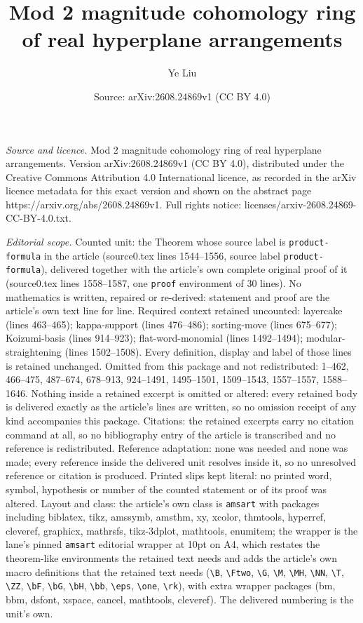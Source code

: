 \documentclass[10pt,a4paper]{amsart}
\title[Mod 2 magnitude cohomology ring of real hyperplane arrangeme]{Mod 2 magnitude cohomology ring of real hyperplane arrangements}
\author{Ye Liu}
\date{Source: arXiv:2608.24869v1 (CC BY 4.0)}
\begin{document}
\maketitle

\noindent\emph{Source and licence.} Mod 2 magnitude cohomology ring of real hyperplane arrangements. Version arXiv:2608.24869v1 (CC BY 4.0), distributed under the Creative Commons Attribution 4.0 International licence, as recorded in the arXiv licence metadata for this exact version and shown on the abstract page https://arxiv.org/abs/2608.24869v1. Full rights notice: licenses/arxiv-2608.24869-CC-BY-4.0.txt.\par\smallskip

\noindent\textit{Editorial scope.} Counted unit: the Theorem whose source label is \texttt{product-formula} in the article (source0.tex lines 1544--1556, source label \texttt{product-formula}), delivered together with the article's own complete original proof of it (source0.tex lines 1558--1587, one \texttt{proof} environment of 30 lines). No mathematics is written, repaired or re-derived: statement and proof are the article's own text line for line. Required context retained uncounted: layercake (lines 463--465); kappa-support (lines 476--486); sorting-move (lines 675--677); Koizumi-basis (lines 914--923); flat-word-monomial (lines 1492--1494); modular-straightening (lines 1502--1508). Every definition, display and label of those lines is retained unchanged. Omitted from this package and not redistributed: 1--462, 466--475, 487--674, 678--913, 924--1491, 1495--1501, 1509--1543, 1557--1557, 1588--1646. Nothing inside a retained excerpt is omitted or altered: every retained body is delivered exactly as the article's lines are written, so no omission receipt of any kind accompanies this package. Citations: the retained excerpts carry no citation command at all, so no bibliography entry of the article is transcribed and no reference is redistributed. Reference adaptation: none was needed and none was made; every reference inside the delivered unit resolves inside it, so no unresolved reference or citation is produced. Printed slips kept literal: no printed word, symbol, hypothesis or number of the counted statement or of its proof was altered. Layout and class: the article's own class is \texttt{amsart} with packages including biblatex, tikz, amssymb, amsthm, xy, xcolor, thmtools, hyperref, cleveref, graphicx, mathrsfs, tikz-3dplot, mathtools, enumitem; the wrapper is the lane's pinned \texttt{amsart} editorial wrapper at 10pt on A4, which restates the theorem-like environments the retained text needs and adds the article's own macro definitions that the retained text needs (\texttt{\textbackslash B}, \texttt{\textbackslash Ftwo}, \texttt{\textbackslash G}, \texttt{\textbackslash M}, \texttt{\textbackslash MH}, \texttt{\textbackslash NN}, \texttt{\textbackslash T}, \texttt{\textbackslash ZZ}, \texttt{\textbackslash bF}, \texttt{\textbackslash bG}, \texttt{\textbackslash bH}, \texttt{\textbackslash bb}, \texttt{\textbackslash eps}, \texttt{\textbackslash one}, \texttt{\textbackslash rk}), with extra wrapper packages (bm, bbm, dsfont, xspace, cancel, mathtools, cleveref). The delivered numbering is the unit's own. 
\end{document}
